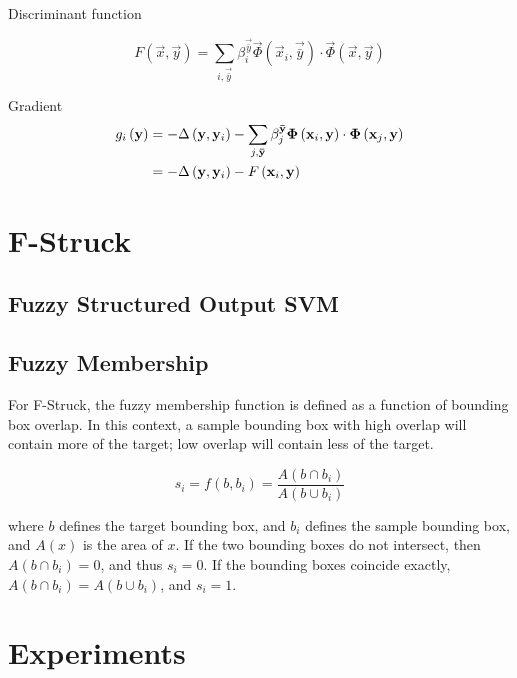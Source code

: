 \documentclass{IEEEtran}
\begin{document}
Discriminant function

\begin{displaymath}
    F(\vec{x}, \vec{y}) = \sum_{i,\vec{\bar{y}}} \beta_i^\vec{\bar{y}}
    \vec{\Phi}\left(\vec{x}_i, \vec{\bar{y}}\right) \cdot \vec{\Phi}\left(\vec{x},
    \vec{y}\right)
\end{displaymath}

Gradient
\begin{align}
    g_i\left(\mathbf{y}\right) &= - \Delta\left(\mathbf{y}, \mathbf{y}_i\right) - \sum_{j,\mathbf{\bar{y}}} \beta_j^{\mathbf{\bar{y}}}
    \mathbf{\Phi}\left(\mathbf{x}_i, \mathbf{y}\right) \cdot \mathbf{\Phi}\left(\mathbf{x}_j,
    \mathbf{y}\right) \\
    &= - \Delta\left(\mathbf{y}, \mathbf{y}_i\right) - F\left(\mathbf{x}_i, \mathbf{y}\right) \nonumber
\end{align}

\section{F-Struck} %

\subsection{Fuzzy Structured Output SVM}

\subsection{Fuzzy Membership} %
For F-Struck, the fuzzy membership function is defined as a function of bounding box overlap. In
this context, a sample bounding box with high overlap will contain more of the target; low overlap
will contain less of the target.

\begin{displaymath}
    s_i = f\left(b, b_i\right) = \frac{A(b \cap b_i)}{A(b \cup b_i)}
\end{displaymath}

where \(b\) defines the target bounding box, and \(b_i\) defines the sample bounding box, and
\(A(x)\) is the area of \(x\). If the two bounding boxes do not intersect, then \(A\left(b \cap
b_i\right) = 0\), and thus \(s_i = 0\). If the bounding boxes coincide exactly,
\(A\left(b \cap b_i\right) = A\left(b \cup b_i\right)\), and \(s_i = 1\).

\section{Experiments} %

\end{document}
